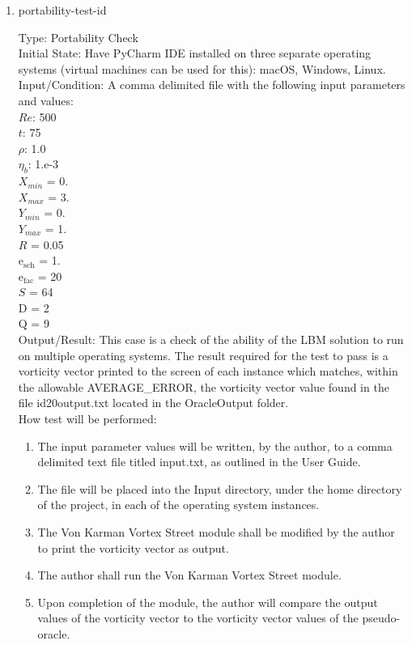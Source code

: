 \documentclass[12pt, titlepage]{article}
\newcounter{testcounter} %
\begin{document}
\begin{enumerate}

\item{portability-test-id\thetestcounter \\}

Type: Portability Check\\
					
Initial State: Have PyCharm IDE installed on three separate operating systems
(virtual machines can be used for this): macOS, Windows, Linux. \\
					
Input/Condition: A comma delimited file with the following input parameters and values:\\
$Re$: 500\\
$t$: 75\\
$\rho$: 1.0\\
$\eta_b$: 1.e-3\\
$X_{min}$ = 0.\\
$X_{max}$ = 3.\\
$Y_{min}$ = 0.\\
$Y_{max}$ = 1.\\
$R$ = 0.05\\
$\mathrm{e_{sch}}$ = 1.\\
$\mathrm{e_{fac}}$ = 20\\
$S$ = 64\\
$\mathrm{D}$ = 2\\
$\mathrm{Q}$ = 9\\

					
Output/Result: This case is a check of the ability of the LBM solution to run on
multiple operating systems. The result required for the test to pass is a
vorticity vector printed to the screen of each instance which matches, within
the allowable AVERAGE\_ERROR, the vorticity vector value found in the file
id20output.txt located in the OracleOutput folder.\\
					
How test will be performed: 

\begin{enumerate}

\item The input parameter values will be written, by the author, to a comma
delimited text file titled input.txt, as outlined in the User Guide.
\item The file will be placed into the Input directory, under the home directory
of the project, in each of the operating system instances.
\item The Von Karman Vortex Street module shall be modified by the author to
print the vorticity vector as output.
\item The author shall run the Von Karman Vortex Street module.
\item Upon completion of the module, the author will compare the output values
of the vorticity vector to the vorticity vector values of the pseudo-oracle.\\
\end{enumerate}

\end{enumerate}
\end{document}
